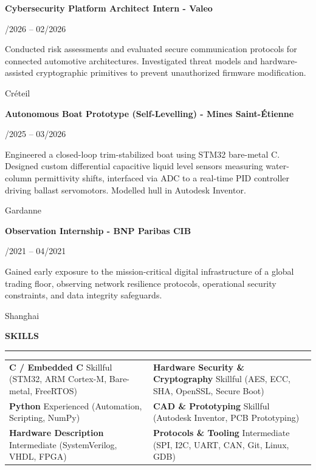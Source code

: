 \documentclass[10pt,a4paper]{article}
\newcommand{\cvSection}[1]{%
  \vspace{6.5pt}%
  {\fontsize{10.5}{12}\selectfont \textbf{#1}}\par\vspace{1.5pt}%
  \rule{\textwidth}{0.75pt}\par\vspace{4.5pt}%
}
\newcommand{\cvItem}[4]{%
  \noindent
  \parbox[t]{0.75\textwidth}{\raggedright \textbf{#1}}\hfill
  \parbox[t]{0.24\textwidth}{\raggedleft \fontsize{8.5}{10.5}\selectfont #2}\par
  \vspace{1.5pt}
  \noindent
  \parbox[t]{0.75\textwidth}{\fontsize{8.7}{11.2}\selectfont #4}\hfill
  \parbox[t]{0.24\textwidth}{\raggedleft \fontsize{8.5}{10.5}\selectfont #3}\par
  \vspace{5pt}
}
\begin{document}
\cvItem{Cybersecurity Platform Architect Intern - Valeo}{01/2026 -- 02/2026}{Créteil}{Conducted risk assessments and evaluated secure communication protocols for connected automotive architectures. Investigated threat models and hardware-assisted cryptographic primitives to prevent unauthorized firmware modification.}

\cvItem{Autonomous Boat Prototype (Self-Levelling) - Mines Saint-Étienne}{10/2025 -- 03/2026}{Gardanne}{Engineered a closed-loop trim-stabilized boat using STM32 bare-metal C. Designed custom differential capacitive liquid level sensors measuring water-column permittivity shifts, interfaced via ADC to a real-time PID controller driving ballast servomotors. Modelled hull in Autodesk Inventor.}

\cvItem{Observation Internship - BNP Paribas CIB}{04/2021 -- 04/2021}{Shanghai}{Gained early exposure to the mission-critical digital infrastructure of a global trading floor, observing network resilience protocols, operational security constraints, and data integrity safeguards.}

\cvSection{SKILLS}
\begin{tabularx}{\textwidth}{@{}X X@{}}
  \textbf{C / Embedded C} \newline
  {\fontsize{8.5}{10.5}\selectfont Skillful (STM32, ARM Cortex-M, Bare-metal, FreeRTOS)} &
  \textbf{Hardware Security \& Cryptography} \newline
  {\fontsize{8.5}{10.5}\selectfont Skillful (AES, ECC, SHA, OpenSSL, Secure Boot)} \\[4.5pt]
  
  \textbf{Python} \newline
  {\fontsize{8.5}{10.5}\selectfont Experienced (Automation, Scripting, NumPy)} &
  \textbf{CAD \& Prototyping} \newline
  {\fontsize{8.5}{10.5}\selectfont Skillful (Autodesk Inventor, PCB Prototyping)} \\[4.5pt]
  
  \textbf{Hardware Description} \newline
  {\fontsize{8.5}{10.5}\selectfont Intermediate (SystemVerilog, VHDL, FPGA)} &
  \textbf{Protocols \& Tooling} \newline
  {\fontsize{8.5}{10.5}\selectfont Intermediate (SPI, I2C, UART, CAN, Git, Linux, GDB)}
\end{tabularx}
\end{document}

